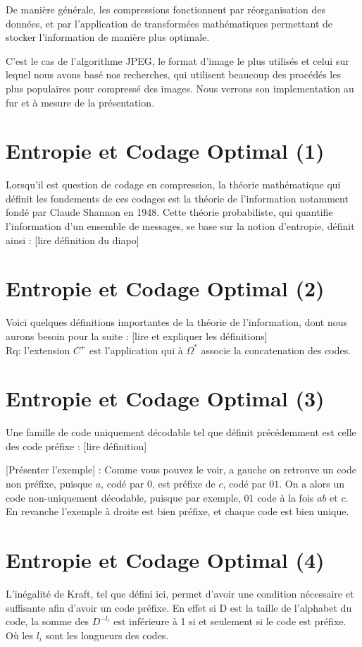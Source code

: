 \documentclass{article}
\begin{document}
De manière générale, les compressions fonctionnent par réorganisation des données, et par l'application de transformées mathématiques
permettant de stocker l'information de manière plus optimale.

C'est le cas de l'algorithme JPEG, le format d'image le plus utilisés et celui sur lequel nous avons basé nos recherches, 
qui utilisent beaucoup des procédés les plus populaires pour compressé des images. Nous verrons son implementation 
au fur et à mesure de la présentation.

\section{Entropie et Codage Optimal (1)}

Lorsqu'il est question de codage en compression, la théorie mathématique qui définit les fondements de ces codages est la théorie
de l'information notamment fondé par Claude Shannon en 1948. Cette théorie probabiliste, qui quantifie l'information d'un ensemble
de messages, se base sur la notion d'entropie, définit ainsi : [lire définition du diapo]

\section{Entropie et Codage Optimal (2)}

Voici quelques définitions importantes de la théorie de l'information, dont nous aurons besoin pour la suite : 
[lire et expliquer les définitions] \\
Rq: l'extension $C^+$ est l'application qui à $\Omega^*$ associe la concatenation des codes.

\section{Entropie et Codage Optimal (3)}

Une famille de code uniquement décodable tel que définit précédemment est celle des code préfixe : [lire définition]

[Présenter l'exemple] :
Comme vous pouvez le voir, a gauche on retrouve un code non préfixe, puisque $a$, codé par $0$, est préfixe de $c$,
codé par $01$. On a alors un code non-uniquement décodable, puisque par exemple, $01$ code à la fois $ab$ et $c$.
En revanche l'exemple à droite est bien préfixe, et chaque code est bien unique.

\section{Entropie et Codage Optimal (4)}
L'inégalité de Kraft, tel que défini ici, permet d'avoir une condition nécessaire et suffisante afin d'avoir un code préfixe.
En effet si D est la taille de l'alphabet du code, la somme des $D^{-l_i}$ est inférieure à 1 si et seulement si le code est préfixe. 
Où les $l_i$ sont les longueurs des codes.
\end{document}
